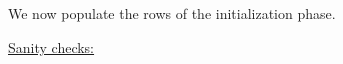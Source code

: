 
We now populate the rows of the initialization phase.
\begin{description}
	\item[\underline{\underline{Sanity checks:}}]
		
		
\end{description}
